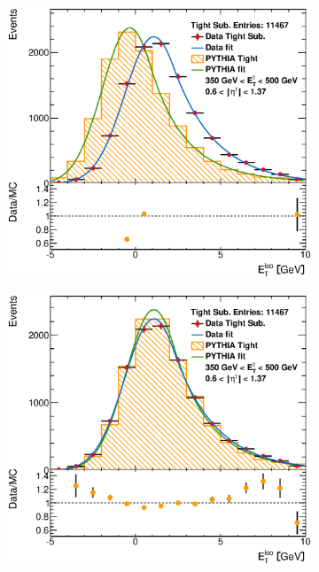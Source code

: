 \documentclass[12pt, twoside]{article}
\numberwithin{equation}{section}
\numberwithin{figure}{section}
\begin{document}
\begin{figure}[h]
    \centering
    \begin{subfigure}[b]{0.4\textwidth}
        \includegraphics[width=\textwidth]{./images/EtISOCorrection/T_MC_FITS-24(10GeV)(Before).eps}
        \subcaption{}
        \label{fig:EtISOCorrectionBefore}
    \end{subfigure}
    \hspace{1.0cm}
    \begin{subfigure}[b]{0.4\textwidth}
        \includegraphics[width=\textwidth]{./images/EtISOCorrection/T_MC_FITS-24(10GeV)(After).eps}
        \subcaption{}
        \label{fig:EtISOCorrectionAfter}
    \end{subfigure}


\end{figure}
\end{document}

